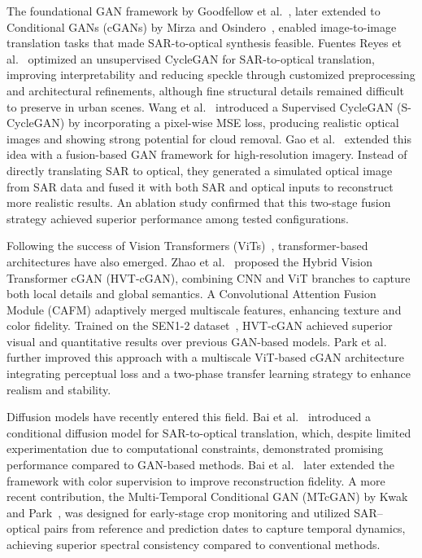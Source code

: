 \documentclass[remotesensing,article,submit,pdftex,moreauthors]{Definitions/mdpi}
\begin{document}
The foundational GAN framework by Goodfellow et al.~\cite{GANs_Goodfellow}, later extended to Conditional GANs (cGANs) by Mirza and Osindero~\cite{cGANs_mirza}, enabled image-to-image translation tasks that made SAR-to-optical synthesis feasible. Fuentes Reyes et al.~\cite{sar2opt_cGAN_Optim_oppr_limits} optimized an unsupervised CycleGAN for SAR-to-optical translation, improving interpretability and reducing speckle through customized preprocessing and architectural refinements, although fine structural details remained difficult to preserve in urban scenes. Wang et al.~\cite{s2ot_s_cycle_adv} introduced a Supervised CycleGAN (S-CycleGAN) by incorporating a pixel-wise MSE loss, producing realistic optical images and showing strong potential for cloud removal. Gao et al.~\cite{cr_fuse_HR_GEN} extended this idea with a fusion-based GAN framework for high-resolution imagery. Instead of directly translating SAR to optical, they generated a simulated optical image from SAR data and fused it with both SAR and optical inputs to reconstruct more realistic results. An ablation study confirmed that this two-stage fusion strategy achieved superior performance among tested configurations.

Following the success of Vision Transformers (ViTs)~\cite{ViT_2020}, transformer-based architectures have also emerged. Zhao et al.~\cite{hvt_cgan} proposed the Hybrid Vision Transformer cGAN (HVT-cGAN), combining CNN and ViT branches to capture both local details and global semantics. A Convolutional Attention Fusion Module (CAFM) adaptively merged multiscale features, enhancing texture and color fidelity. Trained on the SEN1-2 dataset~\cite{sen12_2018}, HVT-cGAN achieved superior visual and quantitative results over previous GAN-based models. Park et al.~\cite{s2o_ViT_cGAN} further improved this approach with a multiscale ViT-based cGAN architecture integrating perceptual loss and a two-phase transfer learning strategy to enhance realism and stability.

Diffusion models have recently entered this field. Bai et al.~\cite{c_diffusion_s2o} introduced a conditional diffusion model for SAR-to-optical translation, which, despite limited experimentation due to computational constraints, demonstrated promising performance compared to GAN-based methods. Bai et al.~\cite{s2o_color_super_diff} later extended the framework with color supervision to improve reconstruction fidelity. A more recent contribution, the Multi-Temporal Conditional GAN (MTcGAN) by Kwak and Park~\cite{assessing_MT_cGANS_s2o_crop}, was designed for early-stage crop monitoring and utilized SAR–optical pairs from reference and prediction dates to capture temporal dynamics, achieving superior spectral consistency compared to conventional methods.
\end{document}
